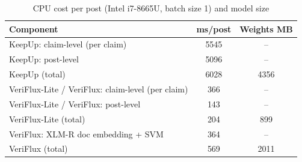 \begin{table}[t]
\centering
\caption{CPU cost per post (Intel i7-8665U, batch size 1) and model size}
\label{tab:cost}
\footnotesize
\begin{tabular}{lcc}
\toprule
Component & ms/post & Weights MB\\
\midrule
KeepUp: claim-level (per claim) & 5545 & --\\
KeepUp: post-level & 5096 & --\\
KeepUp (total) & 6028 & 4356\\
VeriFlux-Lite / VeriFlux: claim-level (per claim) & 366 & --\\
VeriFlux-Lite / VeriFlux: post-level & 143 & --\\
VeriFlux-Lite (total) & 204 & 899\\
VeriFlux: XLM-R doc embedding + SVM & 364 & --\\
VeriFlux (total) & 569 & 2011\\
\bottomrule
\end{tabular}
\end{table}
